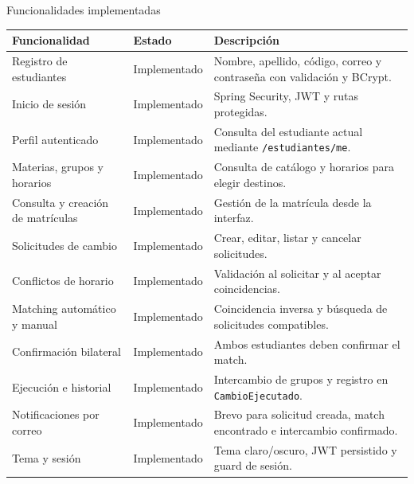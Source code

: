 \documentclass[aspectratio=169,11pt]{beamer}
\begin{document}
\begin{frame}{Funcionalidades implementadas}
\scriptsize
\begin{tabular}{>{\raggedright\arraybackslash}p{}
                >{\raggedright\arraybackslash}p{}
                >{\raggedright\arraybackslash}p{}}
\toprule
\textbf{Funcionalidad} & \textbf{Estado} & \textbf{Descripción} \\
\midrule
Registro de estudiantes & Implementado & Nombre, apellido, código, correo y contraseña con validación y BCrypt. \\
Inicio de sesión & Implementado & Spring Security, JWT y rutas protegidas. \\
Perfil autenticado & Implementado & Consulta del estudiante actual mediante \texttt{/estudiantes/me}. \\
Materias, grupos y horarios & Implementado & Consulta de catálogo y horarios para elegir destinos. \\
Consulta y creación de matrículas & Implementado & Gestión de la matrícula desde la interfaz. \\
Solicitudes de cambio & Implementado & Crear, editar, listar y cancelar solicitudes. \\
Conflictos de horario & Implementado & Validación al solicitar y al aceptar coincidencias. \\
Matching automático y manual & Implementado & Coincidencia inversa y búsqueda de solicitudes compatibles. \\
Confirmación bilateral & Implementado & Ambos estudiantes deben confirmar el match. \\
Ejecución e historial & Implementado & Intercambio de grupos y registro en \texttt{CambioEjecutado}. \\
Notificaciones por correo & Implementado & Brevo para solicitud creada, match encontrado e intercambio confirmado. \\
Tema y sesión & Implementado & Tema claro/oscuro, JWT persistido y guard de sesión. \\
\bottomrule
\end{tabular}
\end{frame}
\end{document}
